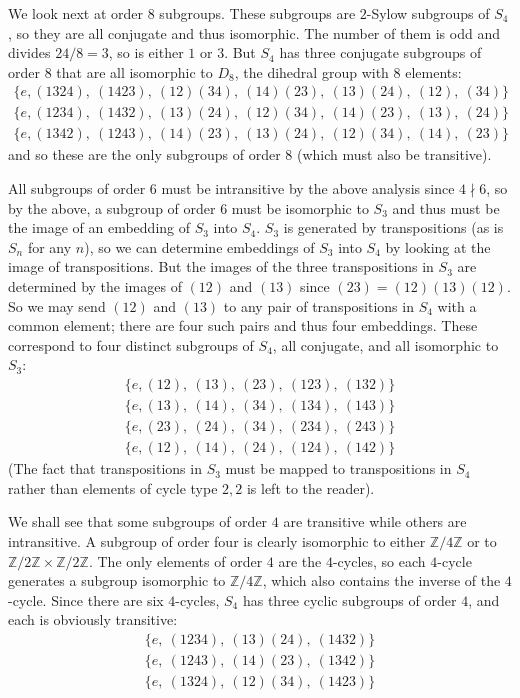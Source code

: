 \documentclass[12pt]{article}
\newcommand{\Ints}{\mathbb{Z}}
\begin{document}
We look next at order $8$ subgroups. These subgroups are $2$-Sylow subgroups of $S_4$, so they are all conjugate and thus isomorphic. The number of them is odd and divides $24/8=3$, so is either $1$ or $3$. But $S_4$ has three conjugate subgroups of order $8$ that are all isomorphic to $D_8$, the dihedral group with $8$ elements:
\begin{gather*}
\{e,(1324),\ (1423),\ (12)(34),\ (14)(23),\ (13)(24),\ (12),\ (34)\}\\
\{e,(1234),\ (1432),\ (13)(24),\ (12)(34),\ (14)(23),\ (13),\ (24)\}\\
\{e,(1342),\ (1243),\ (14)(23),\ (13)(24),\ (12)(34),\ (14),\ (23)\}
\end{gather*}
and so these are the only subgroups of order $8$ (which must also be transitive).

All subgroups of order $6$ must be intransitive by the above analysis since $4\nmid 6$, so by the above, a subgroup of order $6$ must be isomorphic to $S_3$ and thus must be the image of an embedding of $S_3$ into $S_4$. $S_3$ is generated by transpositions (as is $S_n$ for any $n$), so we can determine embeddings of $S_3$ into $S_4$ by looking at the image of transpositions. But the images of the three transpositions in $S_3$ are determined by the images of $(12)$ and $(13)$ since $(23)=(12)(13)(12)$. So we may send $(12)$ and $(13)$ to any pair of transpositions in $S_4$ with a common element; there are four such pairs and thus four embeddings. These correspond to four distinct subgroups of $S_4$, all conjugate, and all isomorphic to $S_3$:
\begin{gather*}
\{e,(12),\ (13),\ (23),\ (123),\ (132)\}\\
\{e,(13),\ (14),\ (34),\ (134),\ (143)\}\\
\{e,(23),\ (24),\ (34),\ (234),\ (243)\}\\
\{e,(12),\ (14),\ (24),\ (124),\ (142)\}
\end{gather*}
(The fact that transpositions in $S_3$ must be mapped to transpositions in $S_4$ rather than elements of cycle type $2,2$ is left to the reader).

We shall see that some subgroups of order $4$ are transitive while others are intransitive. A subgroup of order four is clearly isomorphic to either $\Ints/4\Ints$ or to $\Ints/2\Ints\times\Ints/2\Ints$. The only elements of order $4$ are the $4$-cycles, so each $4$-cycle generates a subgroup isomorphic to $\Ints/4\Ints$, which also contains the inverse of the $4$-cycle. Since there are six $4$-cycles, $S_4$ has three cyclic subgroups of order $4$, and each is obviously transitive:
\begin{gather*}
\{e,\ (1234),\ (13)(24),\ (1432)\}\\
\{e,\ (1243),\ (14)(23),\ (1342)\}\\
\{e,\ (1324),\ (12)(34),\ (1423)\}
\end{gather*} 
\end{document}

